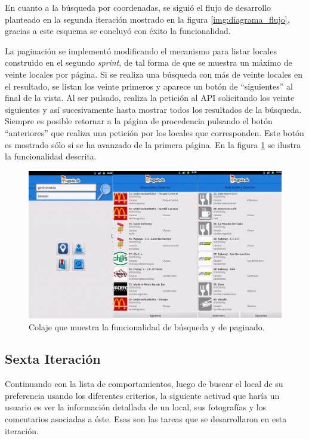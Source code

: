 En cuanto a la búsqueda por coordenadas, se siguió el flujo de desarrollo planteado en la segunda iteración mostrado en la figura \ref{img:diagrama_flujo}, gracias a este esquema se concluyó con éxito la funcionalidad.

La paginación se implementó modificando el mecanismo para listar locales construido en el segundo \textit{sprint}, de tal forma de que se muestra un máximo de veinte locales por página. Si se realiza una búsqueda con más de veinte locales en el resultado, se listan los veinte primeros y aparece un botón de ``siguientes'' al final de la vista. Al ser pulsado, realiza la petición al API solicitando los veinte siguientes y así sucesivamente hasta mostrar todos los resultados de la búsqueda. Siempre es posible retornar a la página de procedencia pulsando el botón ``anteriores'' que realiza una petición por los locales que corresponden. Este botón es mostrado sólo si se ha avanzado de la primera página. En la figura \ref{img:doblesearch} se ilustra la funcionalidad descrita.
 
\begin{figure}[h]
	\begin{center}
		\includegraphics[scale=0.38]{imagenes/search_doble.png}
	\end{center}
	\caption{
		\label{img:doblesearch}
		Colaje que muestra la funcionalidad de búsqueda y de paginado. 
	}
\end{figure}

\subsection{Sexta Iteración}
Continuando con la lista de comportamientos, luego de buscar el local de su preferencia usando los diferentes criterios, la siguiente activad que haría un usuario es ver la información detallada de un local, sus fotografías y los comentarios asociadas a éste. Esas son las tareas que se desarrollaron en esta iteración. 
